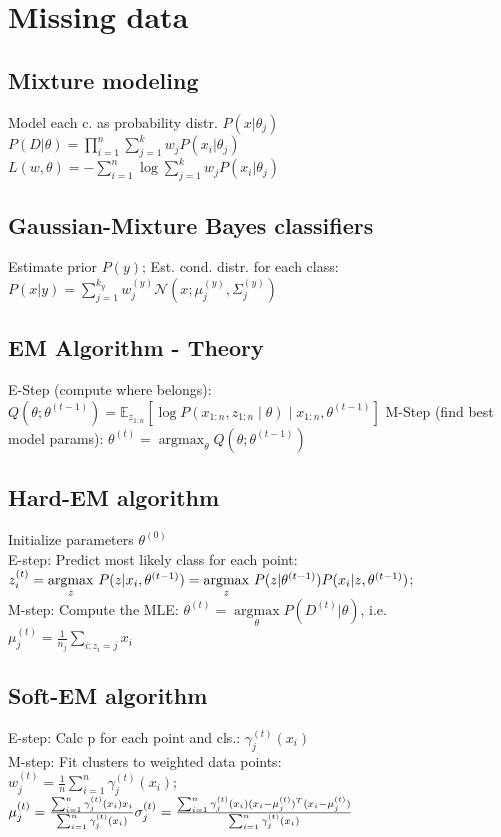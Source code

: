 \section*{Missing data}
\subsection*{Mixture modeling}

Model each c. as probability distr. $P(x|\theta_j)$\\
$P(D|\theta) = \prod_{i=1}^n \sum_{j=1}^k w_j P(x_i|\theta_j)$\\
$L(w, \theta) = - \sum_{i=1}^n \operatorname{log}  \sum_{j=1}^k w_j P(x_i| \theta_j)$

\subsection*{Gaussian-Mixture Bayes classifiers}
Estimate prior $P(y)$; Est. cond. distr. for each class:
$P(x|y) = \sum_{j=1}^{k_y} w_j^{(y)} \mathcal{N}(x; \mu_j^{(y)}, \Sigma_j^{(y)})$\\

\subsection*{EM Algorithm - Theory}
E-Step (compute where belongs): $Q(\theta; \theta^{(t-1)}) = \mathbb{E}_{z_{1:n}} \left[\log P (x_{1:n},z_{1:n} \mid \theta  ) \mid x_{1:n},\theta ^{(t-1)} \right] $
M-Step (find best model params): $\theta^(t) = \operatorname{argmax}_{\theta} Q(\theta; \theta^{(t-1)}) $



\subsection*{Hard-EM algorithm}
Initialize parameters $\theta^{(0)}$\\
E-step: Predict most likely class for each point:
$z_i^{(t)} = \underset{z}{\operatorname{argmax}} ~ P(z|x_i, \theta^{(t-1)})\\
= \underset{z}{\operatorname{argmax}} ~ P(z|\theta^{(t-1)}) P(x_i|z,\theta^{(t-1)})$;\\
M-step: Compute the MLE: $\theta^{(t)} = \underset{\theta}{\operatorname{argmax}} P(D^{(t)}|\theta)$, i.e. $\mu_j^{(t)} = \frac{1}{n_j} \sum_{i: z_i = j} x_i$

\subsection*{Soft-EM algorithm}
E-step: Calc p for each point and cls.: $\gamma_j^{(t)}(x_i)$\\
M-step: Fit clusters to weighted data points:\\
$w_j^{(t)} = \frac{1}{n} \sum_{i=1}^n \gamma_j^{(t)} (x_i)$; 
$\mu_j^{(t)} = \frac{\sum_{i=1}^n \gamma_j^{(t)} (x_i) x_i}{\sum_{i=1}^n \gamma_j^{(t)} (x_i)}\\ %
\sigma_j^{(t)} = \frac{\sum_{i=1}^n \gamma_j^{(t)}(x_i) (x_i - \mu_j^{(t)})^T (x_i - \mu_j^{(t)})}{\sum_{i=1}^n \gamma_j^{(t)}(x_i)}$

